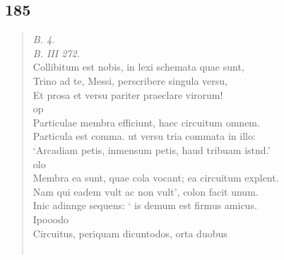 \documentclass[11pt, a4paper]{report}
\begin{document}
            \subsection*{185}
      \begin{verse}
      \textit{B. 4.} \\ \textit{B. III 272.} \\ Collibitum est nobis, in lexi schemata quae sunt, \\ Trino ad te, Messi, perscribere singula versu, \\ Et prosa et versu pariter praeclare virorum! \\ op \\ Particulae membra efficiunt, haec circuitum omnem. \\ Particula est comma. ut versu tria commata in illo: \\ ‘Arcadiam petis, inmensum petis, haud tribuam istnd.’ \\ olo \\ Membra ea sunt, quae cola vocant; ea circuitum explent. \\ Nam qui eadem vult ac non vult’, colon facit unum. \\ Inic adinnge sequens: ‘ is demum est firmus amicus. \\ Ipooodo \\ Circuitus, periquam dicuntodos, orta duobus \\ 
        ﻿\pagebreak 

\end{verse}
\end{document}
